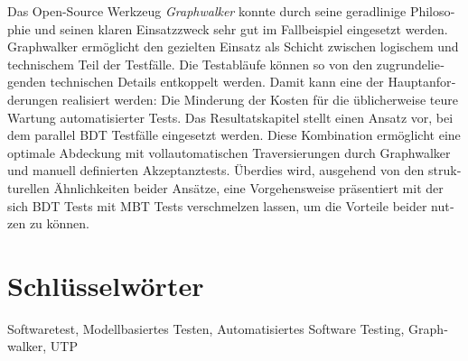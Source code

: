 \begin{otherlanguage}{ngerman}
Das Open-Source Werkzeug \textit{Graphwalker} konnte durch seine geradlinige Philosophie und seinen klaren Einsatzzweck sehr gut im Fallbeispiel eingesetzt werden. Graphwalker ermöglicht den gezielten Einsatz als Schicht zwischen logischem und technischem Teil der Testfälle. Die Testabläufe können so von den zugrundeliegenden technischen Details entkoppelt werden. Damit kann eine der Hauptanforderungen realisiert werden: Die Minderung der Kosten für die üblicherweise teure Wartung automatisierter Tests. Das Resultatskapitel stellt einen Ansatz vor, bei dem parallel \Gls{BDT} Testfälle eingesetzt werden. Diese Kombination ermöglicht eine optimale Abdeckung mit vollautomatischen Traversierungen durch Graphwalker und manuell definierten Akzeptanztests. Überdies wird, ausgehend von den strukturellen Ähnlichkeiten beider Ansätze, eine Vorgehensweise präsentiert mit der sich \Gls{BDT} Tests mit \Gls{MBT} Tests verschmelzen lassen, um die Vorteile beider nutzen zu können.

\bigskip

  \section*{Schlüsselwörter}
  Softwaretest, Modellbasiertes Testen, Automatisiertes Software Testing, Graphwalker, UTP

\end{otherlanguage}


